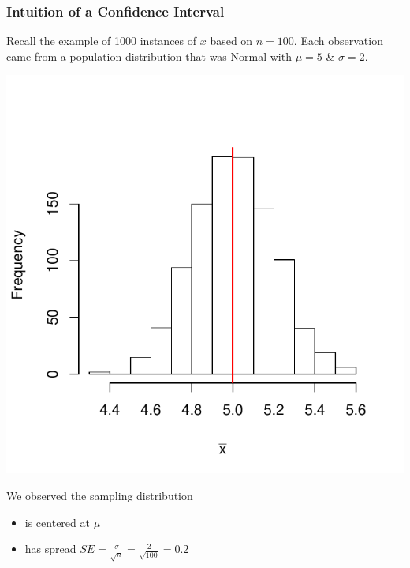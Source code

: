 \documentclass[slides]{beamer}
\newcommand{\xbar}{\overline{x}}
\begin{document}
\begin{frame}[fragile]
\frametitle{Intuition of a Confidence Interval}
Recall the example of 1000 instances of $\xbar$ based on $n=100$.  Each observation came from a population distribution that was Normal with $\mu=5$ \& $\sigma=2$.  

\pause {}
\begin{center}
\includegraphics{figure/lec12-001}
\end{center}

\pause We observed the sampling distribution
\begin{itemize}
\item is centered at $\mu$
\item has spread $SE = \frac{\sigma}{\sqrt n} = \frac{2}{\sqrt{100}} = 0.2$
\end{itemize}

\end{frame}
\end{document}
